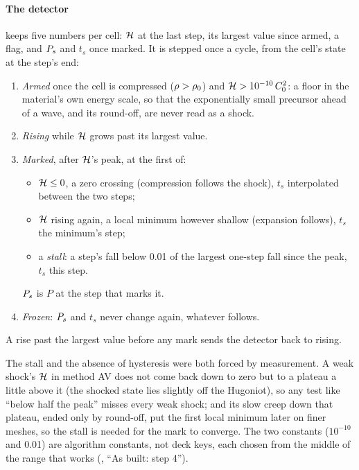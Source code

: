 \paragraph{The detector} keeps five numbers per cell: $\mathcal{H}$ at the last
step, its largest value since armed, a flag, and $P_{s}$ and $t_s$ once
marked. It is stepped once a cycle, from the cell's state at the step's end:
\begin{enumerate}
\item \emph{Armed} once the cell is compressed ($\rho > \rho_0$) and $\mathcal{H} >
  10^{-10}\,C_0^2$: a floor in the material's own energy scale, so that the
  exponentially small precursor ahead of a wave, and its round-off, are never
  read as a shock.
\item \emph{Rising} while $\mathcal{H}$ grows past its largest value.
\item \emph{Marked}, after $\mathcal{H}$'s peak, at the first of:
  \begin{itemize}
  \item $\mathcal{H} \le 0$, a zero crossing (compression follows the shock), $t_s$
    interpolated between the two steps;
  \item $\mathcal{H}$ rising again, a local minimum however shallow (expansion
    follows), $t_s$ the minimum's step;
  \item a \emph{stall}: a step's fall below 0.01 of the largest one-step fall
    since the peak, $t_s$ this step.
  \end{itemize}
  $P_{s}$ is $P$ at the step that marks it.
\item \emph{Frozen}: $P_{s}$ and $t_s$ never change again, whatever follows.
\end{enumerate}
A rise past the largest value before any mark sends the detector back to
rising.

The stall and the absence of hysteresis were both forced by measurement. A
weak shock's $\mathcal{H}$ in method AV does not come back down to zero but to a
plateau a little above it (the shocked state lies slightly off the
Hugoniot), so any test like ``below half the peak'' misses every weak shock;
and its slow creep down that plateau, ended only by round-off, put the first
local minimum later on finer meshes, so the stall is needed for the mark to
converge. The two constants ($10^{-10}$ and 0.01) are algorithm constants,
not deck keys, each chosen from the middle of the range that works
(, ``As built: step 4'').

